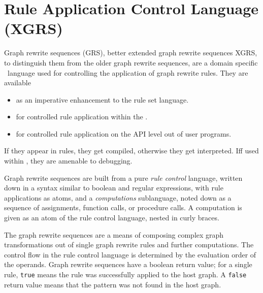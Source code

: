 \chapter{Rule Application Control Language (XGRS)}
\label{cha:xgrs}

Graph rewrite sequences (GRS), better extended graph rewrite sequences XGRS, to distinguish them from the older graph rewrite sequences, are a domain specific \GrG~language used for controlling the application of graph rewrite rules. 
They are available
\begin{itemize}
\item as an imperative enhancement to the rule set language.
\item for controlled rule application within the \GrShell.
\item for controlled rule application on the API level out of user programs.
\end{itemize}

If they appear in rules, they get compiled, otherwise they get interpreted.
Iff used within \GrShell, they are amenable to debugging.

Graph rewrite sequences are built from a pure \emph{rule control} language,
written down in a syntax similar to boolean and regular expressions, with rule applications as atoms,
and a \emph{computations} sublanguage,
noted down as a sequence of assignments, function calls, or procedure calls.
A computation is given as an atom of the rule control language, nested in curly braces.

The graph rewrite sequences are a means of composing complex graph transformations out of single graph rewrite rules and further computations.
The control flow in the rule control language is determined by the evaluation order of the operands.
Graph rewrite sequences have a boolean return value; for a single rule, \texttt{true} means the rule was successfully applied to the host graph.
A \texttt{false} return value means that the pattern was not found in the host graph. 

